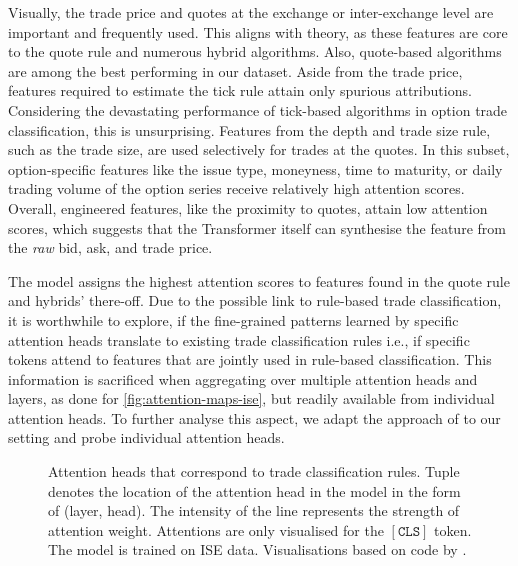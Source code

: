 Visually, the trade price and quotes at the exchange or inter-exchange level are important and frequently used. This aligns with theory, as these features are core to the quote rule and numerous hybrid algorithms. Also, quote-based algorithms are among the best performing in our dataset. Aside from the trade price, features required to estimate the tick rule attain only spurious attributions. Considering the devastating performance of tick-based algorithms in option trade classification, this is unsurprising. Features from the depth and trade size rule, such as the trade size, are used selectively for trades at the quotes. In this subset, option-specific features like the issue type, moneyness, time to maturity, or daily trading volume of the option series receive relatively high attention scores.  Overall, engineered features, like the proximity to quotes, attain low attention scores, which suggests that the Transformer itself can synthesise the feature from the \emph{raw} bid, ask, and trade price.

The model assigns the highest attention scores to features found in the quote rule and hybrids' there-off. Due to the possible link to rule-based trade classification, it is worthwhile to explore, if the fine-grained patterns learned by specific attention heads translate to existing trade classification rules i.e., if specific tokens attend to features that are jointly used in rule-based classification. This information is sacrificed when aggregating over multiple attention heads and layers, as done for \cref{fig:attention-maps-ise}, but readily available from individual attention heads. To further analyse this aspect, we adapt the approach of \textcite[][4]{clarkWhatDoesBERT2019} to our setting and probe individual attention heads.

\begin{figure}[h!]
    \hfill
    \hfill
    \caption[Attention Heads That Correspond To Trade Classification Rules]{Attention heads that correspond to trade classification rules. Tuple denotes the location of the attention head in the model in the form of (layer, head). The intensity of the line represents the strength of attention weight. Attentions are only visualised for the $\mathtt{[CLS]}$ token. The model is trained on \gls{ISE} data. Visualisations based on code by \textcite[][4]{clarkWhatDoesBERT2019}.}
    \label{fig:rule-like-attention-heads}
\end{figure}

